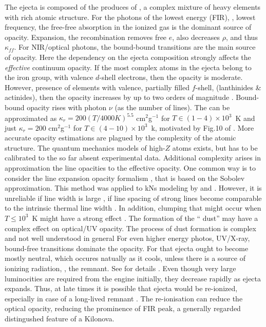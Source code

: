 The ejecta is composed of the produces of \rproc{}, a complex mixture of heavy elements with 
rich atomic structure. 
For the photons of the lowest energy (FIR), \eg, lowest frequency, the free-free absorption in the ionized gas is the dominant source of opacity. Expansion, the recombination removes free $e$, also decreases $\rho$, and thus $\kappa_{ff}$.
For \ac{NIR}/optical photons, the bound-bound transitions are the main source of opacity. Here the dependency on the ejecta composition strongly affects the \textit{effective} continuum opacity. If the most complex atoms in the ejecta belong to the iron group, with valence $d$-shell electrons, then the opacity is moderate. However, presence of elements with valence, partially filled $f$-shell, (lanthinides \& actinides), then the opacity increases by up to two orders of magnitude \citep{Kasen:2013xka,Tanaka:2013ana,Fontes:2015,Fontes:2017zfb}. Bound-bound opacity rises with photon $\nu$ (as the number of lines).
The  can be approximated as $\kappa_r = 200 (T/4000K)^{5.5}$ cm$^2$g$^{-1}$ for $T\in(1-4)\times10^3$~K and just $\kappa_r=200$ cm$^2$g$^{-1}$ for $T\in(4-10)\times10^{3}$~k, motivated by Fig.10 of \citep{Kasen:2013xka}. More accurate opacity estimations are plagued by the complexity of the atomic structure. The quantum mechanics models of high-$Z$ atoms exists, but has to be calibrated to the so far absent experimental data.
Additional complexity arises in approximation the line opacities to the effective opacity.
One common way is to consider the line expansion opacity formalism \citep{Pinto:2000}, that is based on the Sobolev approximation. This method was applied to \acp{kN} modeling by \citet{Barnes:2013wka} and \citet{Tanaka:2013ana}. However, it is unreliable if line width is large \ie, if line spacing of strong lines become comparable to the intrinsic thermal line width \citep{Kasen:2013xka,Fontes:2015,Fontes:2017zfb}. 
In addition, clumping that might occur when $T\leq10^3$~K might have a strong effect \citep{Takami:2014oqa}. The formation of the ``\rproc{} dust'' may have a complex effect on optical/UV opacity. The process of dust formation is complex and not well understood in general \citep{Cherchneff:2009sj,Lazzati:2016}
For even higher energy photos, UV/X-ray, bound-free transitions dominate the opacity. For that ejecta ought to become mostly neutral, which occures natually as it cools, unless there is a source of ionizing radiation, \eg, the remnant. See for details \cite[\eg][]{Metzger:2013cha}. Even though very large luminocities are required from the engine initially, they decrease rapidly as ejecta expands. Thus, at late times it is possible that ejecta would be re-ionized, especially in case of a long-lived remnant \citep{Metzger:2013cha}. The re-ionisation can reduce the optical opacity, reducing the prominence of FIR peak, a generally regarded distingushed feature of a Kilonova.
